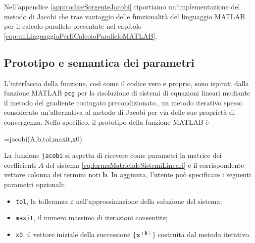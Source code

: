 Nell'appendice \ref{app:codiceSorgenteJacobi} riportiamo un'implementazione del metodo di Jacobi che trae vantaggio delle funzionalit\`a del linguaggio MATLAB per il 
calcolo parallelo presentate nel capitolo \ref{cap:unLinguaggioPerIlCalcoloParalleloMATLAB}.

\subsection{Prototipo e semantica dei parametri}
L'interfaccia della funzione, cos\`i come il codice vero e proprio, sono ispirati dalla funzione MATLAB 
\lstinline|pcg| per la risoluzione di sistemi di equazioni lineari mediante il metodo del gradiente coniugato precondizionato\,\cite{TheMathWorksincPcgSolveSystem}, 
un metodo iterativo spesso considerato un'alternativa al metodo di Jacobi per via delle sue propriet\`a di convergenza.
Nello specifico, il prototipo della funzione MATLAB \`e
\begin{matlabcode}
=jacobi(A,b,tol,maxit,x0)
\end{matlabcode}
La funzione \lstinline|jacobi| si aspetta di ricevere come parametri la matrice dei coefficienti $A$ del sistema \eqref{eq:formaMatricialeSistemiLineari} e il corrispondente vettore colonna dei termini noti $\mathbf{b}$.\newline
In aggiunta, l'utente pu\`o specificare i seguenti parametri opzionali:
\begin{itemize}
    \item \lstinline|tol|, la tolleranza $\varepsilon$ nell'approssimazione della soluzione del sistema;
    \item \lstinline|maxit|, il numero massimo di iterazioni consentite;
    \item \lstinline|x0|, il vettore iniziale della successione $\mathbf{\{x^{(k)}\}}$ costruita dal metodo iterativo.
\end{itemize}


